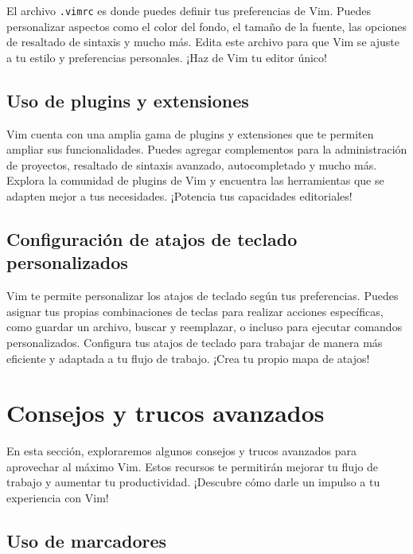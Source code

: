 \documentclass[
  a4paper,
]{article}
\begin{document}
El archivo \texttt{.vimrc} es donde puedes definir tus preferencias de
Vim. Puedes personalizar aspectos como el color del fondo, el tamaño de
la fuente, las opciones de resaltado de sintaxis y mucho más. Edita este
archivo para que Vim se ajuste a tu estilo y preferencias personales.
¡Haz de Vim tu editor único!

\hypertarget{uso-de-plugins-y-extensiones}{%
\subsection{Uso de plugins y
extensiones}\label{uso-de-plugins-y-extensiones}}

Vim cuenta con una amplia gama de plugins y extensiones que te permiten
ampliar sus funcionalidades. Puedes agregar complementos para la
administración de proyectos, resaltado de sintaxis avanzado,
autocompletado y mucho más. Explora la comunidad de plugins de Vim y
encuentra las herramientas que se adapten mejor a tus necesidades.
¡Potencia tus capacidades editoriales!

\hypertarget{configuraciuxf3n-de-atajos-de-teclado-personalizados}{%
\subsection{Configuración de atajos de teclado
personalizados}\label{configuraciuxf3n-de-atajos-de-teclado-personalizados}}

Vim te permite personalizar los atajos de teclado según tus
preferencias. Puedes asignar tus propias combinaciones de teclas para
realizar acciones específicas, como guardar un archivo, buscar y
reemplazar, o incluso para ejecutar comandos personalizados. Configura
tus atajos de teclado para trabajar de manera más eficiente y adaptada a
tu flujo de trabajo. ¡Crea tu propio mapa de atajos!

\hypertarget{consejos-y-trucos-avanzados}{%
\section{Consejos y trucos
avanzados}\label{consejos-y-trucos-avanzados}}

En esta sección, exploraremos algunos consejos y trucos avanzados para
aprovechar al máximo Vim. Estos recursos te permitirán mejorar tu flujo
de trabajo y aumentar tu productividad. ¡Descubre cómo darle un impulso
a tu experiencia con Vim!

\hypertarget{uso-de-marcadores}{%
\subsection{Uso de marcadores}\label{uso-de-marcadores}}
\end{document}
